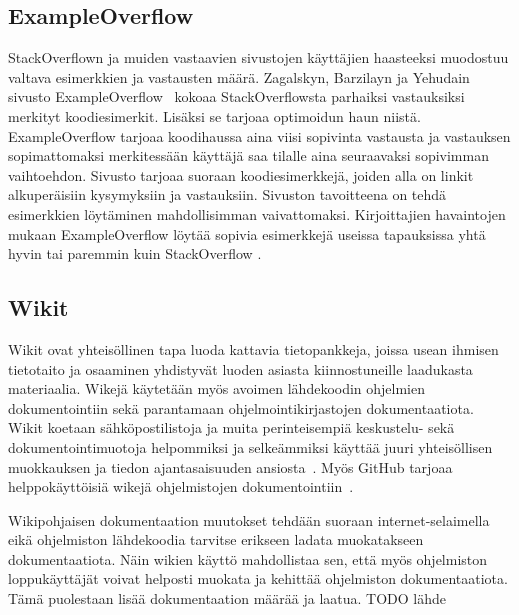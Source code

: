 \documentclass[finnish]{tktltiki2}
\theoremstyle{definition}
\theoremstyle{remark}
\begin{document}
\subsection{ExampleOverflow}
\label{ch:exampleoverflow}
StackOverflown ja muiden vastaavien sivustojen käyttäjien haasteeksi muodostuu valtava esimerkkien ja vastausten määrä. Zagalskyn, Barzilayn ja Yehudain sivusto ExampleOverflow~\cite{example-overflow-social-media-for-code-recommendations} kokoaa StackOverflowsta parhaiksi vastauksiksi merkityt koodiesimerkit. Lisäksi se tarjoaa optimoidun haun niistä. ExampleOverflow tarjoaa koodihaussa aina viisi sopivinta vastausta ja vastauksen sopimattomaksi merkitessään käyttäjä saa tilalle aina seuraavaksi sopivimman vaihtoehdon. Sivusto tarjoaa suoraan koodiesimerkkejä, joiden alla on linkit alkuperäisiin kysymyksiin ja vastauksiin. Sivuston tavoitteena on tehdä esimerkkien löytäminen mahdollisimman vaivattomaksi. Kirjoittajien havaintojen mukaan ExampleOverflow löytää sopivia esimerkkejä useissa tapauksissa yhtä hyvin tai paremmin kuin StackOverflow \cite{example-overflow-social-media-for-code-recommendations}.

\subsection{Wikit}
\label{ch:wiki}
Wikit ovat yhteisöllinen tapa luoda kattavia tietopankkeja, joissa usean ihmisen tietotaito ja osaaminen yhdistyvät luoden asiasta kiinnostuneille laadukasta materiaalia. Wikejä käytetään myös avoimen lähdekoodin ohjelmien dokumentointiin sekä parantamaan ohjelmointikirjastojen dokumentaatiota. Wikit koetaan sähköpostilistoja ja muita perinteisempiä keskustelu- sekä dokumentointimuotoja helpommiksi ja selkeämmiksi käyttää juuri yhteisöllisen muokkauksen ja tiedon ajantasaisuuden ansiosta~\cite{using-wikis-in-sw}.
Myös GitHub tarjoaa helppokäyttöisiä wikejä ohjelmistojen dokumentointiin~\cite{github-wiki}.

Wikipohjaisen dokumentaation muutokset tehdään suoraan internet-selaimella eikä ohjelmiston lähdekoodia tarvitse erikseen ladata muokatakseen dokumentaatiota. Näin wikien käyttö mahdollistaa sen, että myös ohjelmiston loppukäyttäjät voivat helposti muokata ja kehittää ohjelmiston dokumentaatiota. Tämä puolestaan lisää dokumentaation määrää ja laatua. TODO lähde
\end{document}
